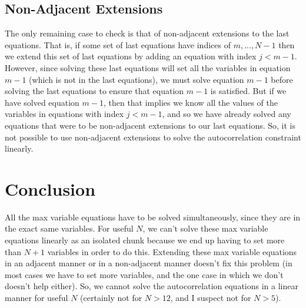 \documentclass[a4paper]{article}
\begin{document}
\subsection*{Non-Adjacent Extensions}
The only remaining case to check is that of non-adjacent extensions to the last equations. That is, if some set of last equations have indices of $m,...,N-1$ then we extend this set of last equations by adding an equation with index $j < m - 1$. However, since solving these last equations will set all the variables in equation $m-1$ (which is not in the last equations), we must solve equation $m-1$ before solving the last equations to ensure that equation $m-1$ is satisfied. But if we have solved equation $m-1$, then that implies we know all the values of the variables in equations with index $j < m-1$, and so we have already solved any equations that were to be non-adjacent extensions to our last equations. So, it is not possible to use non-adjacent extensions to solve the autocorrelation constraint linearly.
\section*{Conclusion}
All the max variable equations have to be solved simultaneously, since they are in the exact same variables. For useful $N$, we can't solve these max variable equations linearly as an isolated chunk because we end up having to set more than $N+1$ variables in order to do this. Extending these max variable equations in an adjacent manner or in a non-adjacent manner doesn't fix this problem (in most cases we have to set more variables, and the one case in which we don't doesn't help either). So, we cannot solve the autocorrelation equations in a linear manner for useful $N$ (certainly not for $N > 12$, and I suspect not for $N > 5$).
\end{document}
